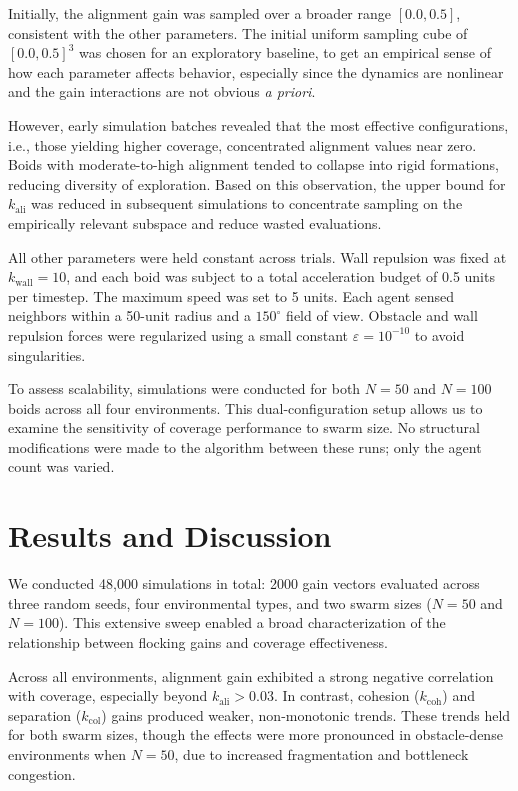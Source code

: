 \documentclass[12pt]{article}
\begin{document}
Initially, the alignment gain was sampled over a broader range \([0.0, 0.5]\), consistent with the other parameters. The initial uniform sampling cube of \([0.0, 0.5]^3\) was chosen for an exploratory baseline, to get an empirical sense of how each parameter affects behavior, especially since the dynamics are nonlinear and the gain interactions are not obvious \emph{a priori}.

However, early simulation batches revealed that the most effective configurations, i.e., those yielding higher coverage, concentrated alignment values near zero. Boids with moderate-to-high alignment tended to collapse into rigid formations, reducing diversity of exploration. Based on this observation, the upper bound for \(k_\text{ali}\) was reduced in subsequent simulations to concentrate sampling on the empirically relevant subspace and reduce wasted evaluations.

All other parameters were held constant across trials. Wall repulsion was fixed at \(k_\text{wall} = 10\), and each boid was subject to a total acceleration budget of 0.5 units per timestep. The maximum speed was set to 5 units. Each agent sensed neighbors within a 50-unit radius and a \(150^\circ\) field of view. Obstacle and wall repulsion forces were regularized using a small constant \(\varepsilon = 10^{-10}\) to avoid singularities.

To assess scalability, simulations were conducted for both \(N = 50\) and \(N = 100\) boids across all four environments. This dual-configuration setup allows us to examine the sensitivity of coverage performance to swarm size. No structural modifications were made to the algorithm between these runs; only the agent count was varied.

\section{Results and Discussion}

We conducted 48,000 simulations in total: 2000 gain vectors evaluated across three random seeds, four environmental types, and two swarm sizes (\(N = 50\) and \(N = 100\)). This extensive sweep enabled a broad characterization of the relationship between flocking gains and coverage effectiveness.

Across all environments, alignment gain exhibited a strong negative correlation with coverage, especially beyond \(k_\text{ali} > 0.03\). In contrast, cohesion (\(k_\text{coh}\)) and separation (\(k_\text{col}\)) gains produced weaker, non-monotonic trends. These trends held for both swarm sizes, though the effects were more pronounced in obstacle-dense environments when \(N = 50\), due to increased fragmentation and bottleneck congestion.
\end{document}
